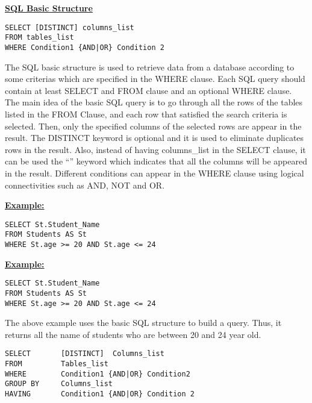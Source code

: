 \noindent\textbf{\underline{SQL Basic Structure}} 
\begin{mdframed}[backgroundcolor=lightgray!20] 
\begin{verbatim}
SELECT [DISTINCT] columns_list
FROM tables_list
WHERE Condition1 {AND|OR} Condition 2
\end{verbatim}
\end{mdframed}
The SQL basic structure is used to retrieve data from a database according to some criterias which are specified in the WHERE clause. Each SQL query should contain at least SELECT and FROM clause and an optional WHERE clause. The main idea of the basic SQL query is to go through all the rows of the tables listed in the FROM Clause, and each row that satisfied the search criteria is selected. Then, only the specified columns of the selected rows are appear in the result. The DISTINCT keyword is optional and it is used to eliminate duplicates rows in the result. Also, instead of having columns\_list in the SELECT clause, it can be used the “\*” keyword which indicates that all the columns will be appeared in the result. Different conditions can appear in the WHERE clause using logical connectivities such as AND, NOT and OR.  

\noindent\textbf{\underline{Example:}}
\begin{mdframed}[backgroundcolor=gray!20] 
\begin{verbatim}
SELECT St.Student_Name
FROM Students AS St 
WHERE St.age >= 20 AND St.age <= 24
\end{verbatim}
\end{mdframed}

\noindent\textbf{\underline{Example:}}
\begin{mdframed}[backgroundcolor=lightgray!20] 
\begin{lstlisting}[style=SQL]
SELECT St.Student_Name
FROM Students AS St 
WHERE St.age >= 20 AND St.age <= 24
\end{lstlisting}
\end{mdframed}

The above example uses the basic SQL structure to build a query. Thus, it returns all the name of students who are between 20 and 24 year old. 
 
\begin{mdframed}[backgroundcolor=lightgray!20] 
\begin{lstlisting}[style=SQL]
SELECT       [DISTINCT]  Columns_list
FROM         Tables_list
WHERE        Condition1 {AND|OR} Condition2
GROUP BY     Columns_list
HAVING       Condition1 {AND|OR} Condition 2
\end{lstlisting}
\end{mdframed}

